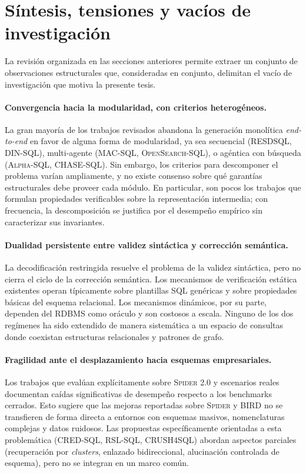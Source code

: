 \section{Síntesis, tensiones y vacíos de investigación}
\label{sec:sota-sintesis}

La revisión organizada en las secciones anteriores permite extraer un
conjunto de observaciones estructurales que, consideradas en conjunto,
delimitan el vacío de investigación que motiva la presente tesis.

\paragraph{Convergencia hacia la modularidad, con criterios heterogéneos.}
La gran mayoría de los trabajos revisados abandona la generación monolítica
\emph{end-to-end} en favor de alguna forma de modularidad, ya sea
secuencial (\textsc{RESDSQL}, \textsc{DIN-SQL}), multi-agente
(\textsc{MAC-SQL}, \textsc{OpenSearch-SQL}), o agéntica con búsqueda
(\textsc{Alpha-SQL}, \textsc{CHASE-SQL}). Sin embargo, los criterios para
descomponer el problema varían ampliamente, y no existe consenso sobre qué
garantías estructurales debe proveer cada módulo. En particular, son pocos
los trabajos que formulan propiedades verificables sobre la representación
intermedia; con frecuencia, la descomposición se justifica por el
desempeño empírico sin caracterizar sus invariantes.

\paragraph{Dualidad persistente entre validez sintáctica y corrección
semántica.} La decodificación restringida resuelve el problema de la
validez sintáctica, pero no cierra el ciclo de la corrección semántica. Los
mecanismos de verificación estática existentes operan típicamente sobre
plantillas \ac{SQL} genéricas y sobre propiedades básicas del esquema
relacional. Los mecanismos dinámicos, por su parte, dependen del
\ac{RDBMS} como oráculo y son costosos a escala. Ninguno de los dos
regímenes ha sido extendido de manera sistemática a un espacio de consultas
donde coexistan estructuras relacionales y patrones de grafo.

\paragraph{Fragilidad ante el desplazamiento hacia esquemas empresariales.}
Los trabajos que evalúan explícitamente sobre \textsc{Spider 2.0} y
escenarios reales documentan caídas significativas de desempeño respecto
a los benchmarks cerrados. Esto sugiere que las mejoras reportadas sobre
\textsc{Spider} y \textsc{BIRD} no se transfieren de forma directa a
entornos con esquemas masivos, nomenclaturas complejas y datos ruidosos.
Las propuestas específicamente orientadas a esta problemática
(\textsc{CRED-SQL}, \textsc{RSL-SQL}, \textsc{CRUSH4SQL}) abordan aspectos
parciales (recuperación por \emph{clusters}, enlazado bidireccional,
alucinación controlada de esquema), pero no se integran en un marco común.

